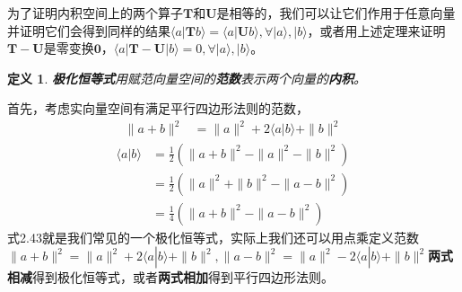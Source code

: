 \documentclass[mathserif,hyperref,UTF8,openany,b5paper]{ctexbook}
\newtheorem{defn}{定义}[section]
\begin{document}
为了证明内积空间上的两个算子$\mathbf{T}$和$\mathbf{U}$是相等的，我们可以让它们作用于任意向量并证明它们会得到同样的结果$\langle a|\mathbf{T}b\rangle=\langle a|\mathbf{U}b\rangle,\forall |a\rangle,|b\rangle$，或者用上述定理来证明$\mathbf{T-U}$是零变换$\mathbf{0}$，$\langle a|\mathbf{T-U}|b\rangle=0,\forall |a\rangle,|b\rangle$。
\begin{defn}
\textbf{极化恒等式}用赋范向量空间的\textbf{范数}表示两个向量的\textbf{内积}。
\end{defn}
首先，考虑实向量空间有满足平行四边形法则的范数，
\begin{align}
     \|a+b\|^2&=\|a\|^2+2\langle a| b\rangle+\|b\|^2 
\end{align}
\begin{align}
    \langle a| b\rangle &= \frac{1}{2}(\|a+b\|^2-\|a\|^2-\|b\|^2)\\
     &= \frac{1}{2}(\|a\|^2+\|b\|^2-\|a-b\|^2)\\
     &= \frac{1}{4}(\|a+b\|^2-\|a-b\|^2)
\end{align}
式2.43就是我们常见的一个极化恒等式，实际上我们还可以用点乘定义范数$\|a+b\|^2=\|a\|^2+2\langle a| b\rangle+\|b\|^2,\|a-b\|^2=\|a\|^2-2\langle a| b\rangle+\|b\|^2$\textbf{两式相减}得到极化恒等式，或者\textbf{两式相加}得到平行四边形法则。
\end{document}
